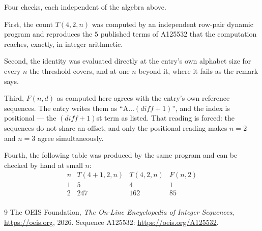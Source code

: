 \documentclass[11pt,a4paper]{article}
\theoremstyle{plain}
\theoremstyle{definition}
\begin{document}
Four checks, each independent of the algebra above.

First, the count $T(4,2,n)$ was computed by an independent row-pair dynamic program and
reproduces the $5$ published terms of A125532 that the computation reaches,
exactly, in integer arithmetic.

Second, the identity was evaluated directly at the entry's own alphabet size for every $n$ the
threshold covers, and at one $n$ beyond it, where it fails as the remark says.

Third, $F(n,d)$ as computed here agrees with the entry's own reference sequences. The entry
writes them as ``$\mathrm{A}\dots(\mathit{diff}+1)$'', and the index is positional --- the
$(\mathit{diff}+1)$st term as listed. That reading is forced: the sequences do not share an
offset, and only the positional reading makes $n=2$ and $n=3$ agree simultaneously.

Fourth, the following table was produced by the same program and can be checked by hand at
small $n$:
\[
\begin{array}{rrrr}
n & T(4+1,2,n) & T(4,2,n) & F(n,2) \\ \hline
1 & 5 & 4 & 1 \\
2 & 247 & 162 & 85 \\
\end{array}
\]

\begin{thebibliography}{9}
 The OEIS Foundation, \emph{The On-Line Encyclopedia of Integer Sequences},
\url{https://oeis.org}, 2026. Sequence A125532: \url{https://oeis.org/A125532}.
\end{thebibliography}
\end{document}
